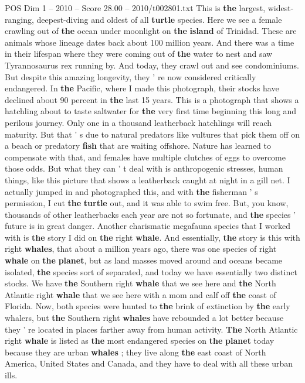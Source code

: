 \begin{textsample}{POS Dim 1 – 2010 – Score 28.00 – 2010/t002801.txt}
This is \textbf{the} largest, widest- ranging, deepest-diving and oldest of all \textbf{turtle} species.
Here we see a female crawling out of \textbf{the} ocean under moonlight on \textbf{the} \textbf{island} of Trinidad.
These are animals whose lineage dates back about 100 million years.
And there was a time in their lifespan where they were coming out of \textbf{the} water to nest and saw Tyrannosaurus rex running by.
And today, they crawl out and see condominiums.
But despite this amazing longevity, they ' re now considered critically endangered.
In \textbf{the} Pacific, where I made this photograph, their stocks have declined about 90 percent in \textbf{the} last 15 years.
This is a photograph that shows a hatchling about to taste saltwater for \textbf{the} very first time beginning this long and perilous journey.
Only one in a thousand leatherback hatchlings will reach maturity.
But that ' s due to natural predators like vultures that pick them off on a beach or predatory \textbf{fish} that are waiting offshore.
Nature has learned to compensate with that, and females have multiple clutches of eggs to overcome those odds.
But what they can ' t deal with is anthropogenic stresses, human things, like this picture that shows a leatherback caught at night in a gill net.
I actually jumped in and photographed this, and with \textbf{the} fisherman ' s permission, I cut \textbf{the} \textbf{turtle} out, and it was able to swim free.
But, you know, thousands of other leatherbacks each year are not so fortunate, and \textbf{the} species ' future is in great danger.
Another charismatic megafauna species that I worked with is \textbf{the} story I did on \textbf{the} right \textbf{whale}.
And essentially, \textbf{the} story is this with right \textbf{whales}, that about a million years ago, there was one species of right \textbf{whale} on \textbf{the} \textbf{planet}, but as land masses moved around and oceans became isolated, \textbf{the} species sort of separated, and today we have essentially two distinct stocks.
We have \textbf{the} Southern right \textbf{whale} that we see here and \textbf{the} North Atlantic right \textbf{whale} that we see here with a mom and calf off \textbf{the} coast of Florida.
Now, both species were hunted to \textbf{the} brink of extinction by \textbf{the} early whalers, but \textbf{the} Southern right \textbf{whales} have rebounded a lot better because they ' re located in places farther away from human activity. \textbf{The} North Atlantic right \textbf{whale} is listed as \textbf{the} most endangered species on \textbf{the} \textbf{planet} today because they are urban \textbf{whales} ; they live along \textbf{the} east coast of North America, United States and Canada, and they have to deal with all these urban ills.

\end{textsample}
